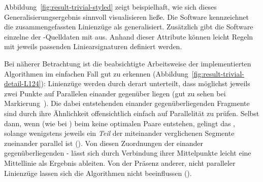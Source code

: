 \documentclass[../main/thesis.tex]{subfiles}
\begin{document}
Abbildung~\ref{fig:result-trivial-styled} zeigt beispielhaft, wie sich dieses Generalisierungsergebnis sinnvoll visualisieren ließe.
Die Software kennzeichnet die zusammengefassten Linienzüge als generalisiert.
Zusätzlich gibt die Software einzelne  der \osm-Quelldaten mit aus.
Anhand dieser Attribute können leicht Regeln mit jeweils passenden Liniearsignaturen definiert werden.


Bei näherer Betrachtung
ist die beabsichtigte Arbeitsweise der implementierten Algorithmen im einfachen Fall gut zu erkennen (Abbildung~\ref{fig:result-trivial-detail-L124}):
Linienzüge werden durch  derart unterteilt, dass möglichst jeweils zwei Punkte auf Parallelen einander gegenüber liegen (gut zu sehen bei Markierung~).
Die dabei entstehenden einander gegenüberliegenden Fragmente sind durch ihre Ähnlichkeit offensichtlich einfach auf Parallelität zu prüfen.
Selbst dann, wenn (wie bei ) beim  keine optimalen Paare entstehen, gelingt das , solange wenigstens jeweils ein \emph{Teil} der miteinander verglichenen Segmente zueinander parallel ist ().
Von diesen Zuordnungen der einander gegenüberliegenden \osm- lässt sich durch Verbindung ihrer Mittelpunkte leicht eine Mittellinie als Ergebnis ableiten.
Von der Präsenz anderer, nicht paralleler Linienzüge lassen sich die Algorithmen nicht beeinflussen ().
\end{document}
